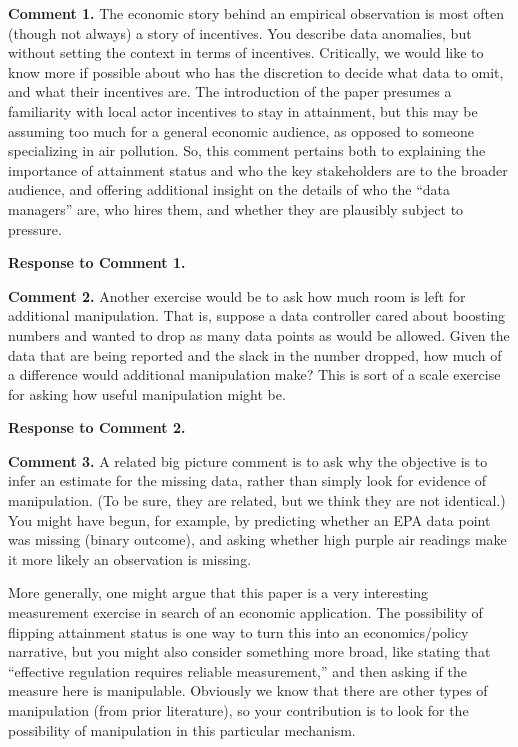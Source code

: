 

\textbf{Comment 1.} The economic story behind an empirical observation is most often (though not always) a story of incentives. You describe data anomalies, but without setting the context in terms of incentives. Critically, we would like to know more if possible about who has the discretion to decide what data to omit, and what their incentives are. The introduction of the paper presumes a familiarity with local actor incentives to stay in attainment, but this may be assuming too much for a general economic audience, as opposed to someone specializing in air pollution. So, this comment pertains both to explaining the importance of attainment status and who the key stakeholders are to the broader audience, and offering additional insight on the details of who the “data managers” are, who hires them, and whether they are plausibly subject to pressure.

\noindent\textbf{Response to Comment 1.} 

\noindent\textbf{Comment 2.} Another exercise would be to ask how much room is left for additional manipulation. That is, suppose a data controller cared about boosting numbers and wanted to drop as many data points as would be allowed. Given the data that are being reported and the slack in the number dropped, how much of a difference would additional manipulation make? This is sort of a scale exercise for asking how useful manipulation might be.

\noindent\textbf{Response to Comment 2.}

\noindent\textbf{Comment 3.} A related big picture comment is to ask why the objective is to infer an estimate for the missing data, rather than simply look for evidence of manipulation. (To be sure, they are related, but we think they are not identical.) You might have begun, for example, by predicting whether an EPA data point was missing (binary outcome), and asking whether high purple air readings make it more likely an observation is missing.

More generally, one might argue that this paper is a very interesting measurement exercise in search of an economic application. The possibility of flipping attainment status is one way to turn this into an economics/policy narrative, but you might also consider something more broad, like stating that “effective regulation requires reliable measurement,” and then asking if the measure here is manipulable. Obviously we know that there are other types of manipulation (from prior literature), so your contribution is to look for the possibility of manipulation in this particular mechanism.

